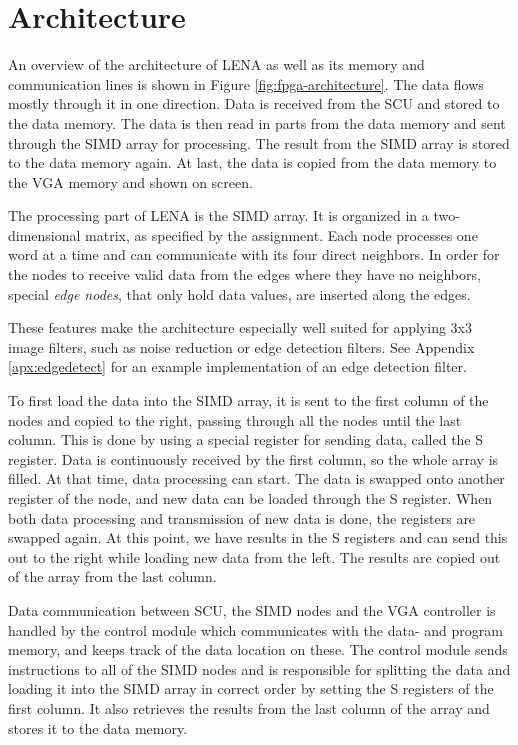 \section{Architecture}



An overview of the architecture of \ac{LENA} as well as its memory and
communication lines is shown in Figure \ref{fig:fpga-architecture}. The data
flows mostly through it in one direction. Data is received from the SCU and
stored to the data memory. The data is then read in parts from the data memory
and sent through the \ac{SIMD} array for processing. The result from the
\ac{SIMD} array is stored to the data memory again. At last, the data is copied
from the data memory to the \ac{VGA} memory and shown on screen.

The processing part of \ac{LENA} is the \ac{SIMD} array. It is organized
in a two-dimensional matrix, as specified by the assignment. Each node
processes one word at a time and can communicate with its four direct
neighbors. In order for the nodes to receive valid data from the edges
where they have no neighbors, special \emph{edge nodes}, that only hold
data values, are inserted along the edges.

These features make the architecture especially well suited for applying
3x3 image filters, such as noise reduction or edge detection filters.
See Appendix \ref{apx:edgedetect} for an example implementation of an edge
detection filter.

To first load the data into the \ac{SIMD} array, it is sent to the first column
of the nodes and copied to the right, passing through all the nodes until the
last column. This is done by using a special register for sending data, called
the S register. Data is continuously received by the first column, so the whole
array is filled. At that time, data processing can start. The data is swapped
onto another register of the node, and new data can be loaded through the S
register. When both data processing and transmission of new data is done, the
registers are swapped again. At this point, we have results in the S registers
and can send this out to the right while loading new data from the left. The
results are copied out of the array from the last column.

Data communication between \ac{SCU}, the \ac{SIMD} nodes and the \ac{VGA}
controller is handled by the control module which communicates with the data-
and program memory, and keeps track of the data location on these. The control
module sends instructions to all of the \ac{SIMD} nodes and is responsible for
splitting the data and loading it into the \ac{SIMD} array in correct order by
setting the S registers of the first column. It also retrieves the results from
the last column of the array and stores it to the data memory.

